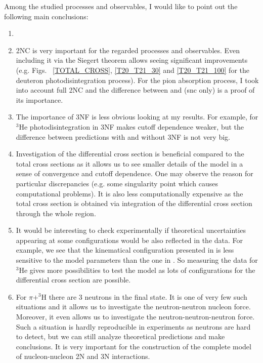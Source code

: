 Among the studied processes and observables, I would like to point out the following 
main conclusions:

\begin{enumerate}
    \item {}
    \item 2NC is very important for the regarded processes and observables. Even including it via the Siegert theorem allows seeing significant improvements (e.g. Figs.~ \ref{TOTAL_CROSS}, \ref{T20_T21_30} and \ref{T20_T21_100} for the deuteron photodisintegration process). For the pion absorption process, I took into account full 2NC and the difference between  and  (\gls{snc} only) is a proof of its importance.
    \item The importance of 3NF is less obvious looking at my results. For example, for $^3$He photodisintegration in  3NF makes cutoff dependence weaker, but the difference between predictions with and without 3NF is not very big.
    \item Investigation of the differential cross section is beneficial compared to the total cross sections as it allows us to see smaller details of the model in a sense of convergence and cutoff dependence. One may observe the reason for particular discrepancies (e.g. some singularity point which causes computational problems). It is also less computationally expensive as the total cross section is obtained via integration of the differential cross section through the whole region.
    \item It would be interesting to check experimentally if theoretical uncertainties appearing at some configurations would be also reflected in the data. For example, we see that the kinematical configuration presented in  is less sensitive to the model parameters than the one in . So measuring the data for $^3$He gives more possibilities to test the model as lots of configurations for the differential cross section are possible.
    \item For $\pi + ^3$H there are 3 neutrons in the final state. It is one of very few such situations and it allows us to investigate the neutron-neutron nucleon force. Moreover, it even allows us to investigate the neutron-neutron-neutron force. Such a situation is hardly reproducible in experiments as neutrons are hard to detect, but we can still analyze theoretical predictions and make conclusions. It is very important for the construction of the complete model of nucleon-nucleon 2N and 3N interactions.

\end{enumerate}
